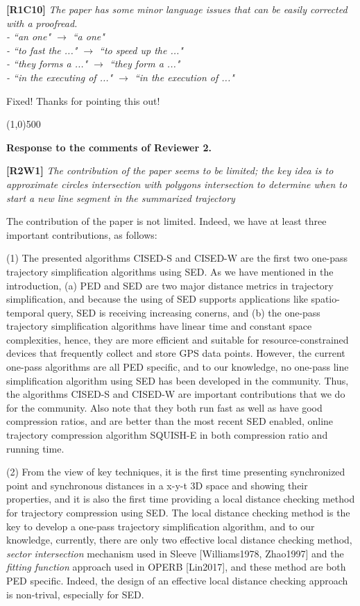\documentclass{letter}
\begin{document}
{\textbf{[R1C10]} \emph{The paper has some minor language issues that can be easily corrected with a proofread.\\
- ``an one" $\rightarrow$ ``a one" \\
- ``to fast the ..." $\rightarrow$ ``to speed up the ..." \\
- ``they forms a ..." $\rightarrow$ ``they form a ..."	\\
- ``in the executing of ..." $\rightarrow$ ``in the execution of ..."
}


Fixed! Thanks for pointing this out!

\line(1,0){500}

\textbf{Response to the comments of Reviewer 2.}

\textbf{[R2W1]} \emph{The contribution of the paper seems to be limited; the key idea is to approximate circles intersection with polygons intersection to determine when to start a new line segment in the summarized trajectory}

The contribution of the paper is not limited. Indeed, we have at least three important contributions, as follows:

(1) The presented algorithms CISED-S and CISED-W are the first two one-pass trajectory simplification algorithms using SED. As we have mentioned in the introduction, (a) PED and SED are two major distance metrics in trajectory simplification, and because the using of SED supports applications like spatio-temporal query, SED is receiving increasing conerns, and (b) the one-pass trajectory simplification algorithms have linear time and constant space complexities, hence, they are more efficient and suitable for resource-constrained devices that frequently collect and store GPS data points. However, the current one-pass algorithms are all PED specific, and to our knowledge, no one-pass line simplification algorithm using SED has been developed in the community. Thus, the algorithms CISED-S and CISED-W are important contributions that we do for the community. Also note that they both run fast as well as have good compression ratios, and are better than the most recent SED enabled, online trajectory compression algorithm SQUISH-E in both compression ratio and running time.

(2) From the view of key techniques, it is the first time presenting synchronized point and synchronous distances in a x-y-t 3D space and showing their properties, and it is also the first time providing a local distance checking method for trajectory compression using SED. The local distance checking method is the key to develop a one-pass trajectory simplification algorithm, and to our knowledge, currently, there are only two effective local distance checking method, \textit{sector intersection} mechanism used in Sleeve [Williams1978, Zhao1997] and the \textit{fitting function} approach used in OPERB [Lin2017], and these method are both PED specific. Indeed, the design of an effective local distance checking approach is non-trival, especially for SED.}
\end{document}
